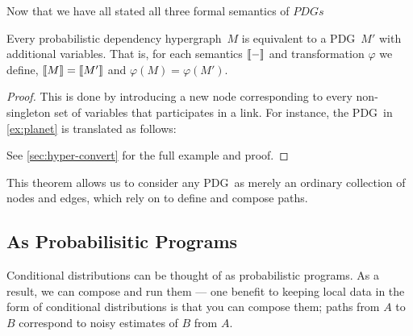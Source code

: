 \documentclass{article}
\newcommand\changeon{\color{note-fg} }
\newcommand\changeoff{\color{black} }
\newcommand\Set{\textbf{Set}}
\newcommand{\modelnamehyper}{probabilistic dependency hypergraph}
\newcommand{\MN}{PDG}
\newcommand{\MNs}{\MN s}
\begin{document}
	\changeon
	
	Now that we have all stated all three formal semantics of $\MNs$

	\changeoff
	

	\begin{theorem}[restate=thmhyperequiv]\label{thm:hyperequiv}
		Every \modelnamehyper\ $M$ is equivalent to a \MN\ $M'$ with additional variables. That is, for each semantics $\llbracket-\rrbracket$ and transformation $\varphi$ we define, $\llbracket M\rrbracket = \llbracket M'\rrbracket$ and $\varphi(M) = \varphi(M')$.
	\end{theorem}
	\begin{proof}
		This is done by introducing a new node corresponding to every non-singleton set of variables that participates in a link. For instance, the \MN\ in \cref{ex:planet} is translated as follows:
		\begin{center}
		\end{center}
		See \cref{sec:hyper-convert} for the full example and proof.
	\end{proof}
	
	This theorem allows us to consider any \MN\ as merely an ordinary collection of nodes and edges, which rely on to define and compose paths.
	

	
	
	\subsection{As Probabilisitic Programs}\label{sec:prog-semantics}
	\changeon
	Conditional distributions can be thought of as probabilistic programs. As a result, we can compose and run them --- one  benefit to keeping local data in the form of conditional distributions is that you can compose them; paths from $A$ to $B$ correspond to noisy estimates of $B$ from $A$.
	
\end{document}

